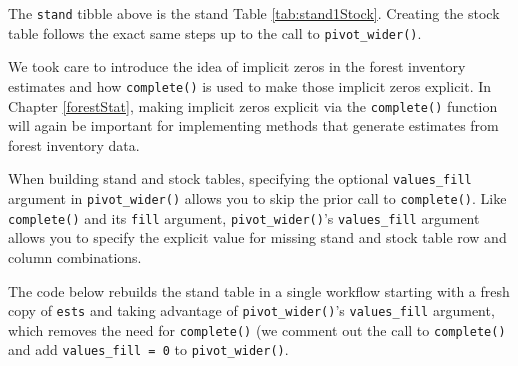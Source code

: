 \documentclass[
  11pt,
]{krantz}
\theoremstyle{definition}
\theoremstyle{definition}
\theoremstyle{definition}
\theoremstyle{definition}
\theoremstyle{remark}
\begin{document}
The \texttt{stand} tibble above is the stand Table \ref{tab:stand1Stock}. Creating the stock table follows the exact same steps up to the call to \texttt{pivot\_wider()}.

We took care to introduce the idea of implicit zeros in the forest inventory estimates and how \texttt{complete()} is used to make those implicit zeros explicit. In Chapter \ref{forestStat}, making implicit zeros explicit via the \texttt{complete()} function will again be important for implementing methods that generate estimates from forest inventory data.

When building stand and stock tables, specifying the optional \texttt{values\_fill} argument in \texttt{pivot\_wider()} allows you to skip the prior call to \texttt{complete()}. Like \texttt{complete()} and its \texttt{fill} argument, \texttt{pivot\_wider()}'s \texttt{values\_fill} argument allows you to specify the explicit value for missing stand and stock table row and column combinations.

The code below rebuilds the stand table in a single workflow starting with a fresh copy of \texttt{ests} and taking advantage of \texttt{pivot\_wider()}'s \texttt{values\_fill} argument, which removes the need for \texttt{complete()} (we comment out the call to \texttt{complete()} and add \texttt{values\_fill\ =\ 0} to \texttt{pivot\_wider()}.
\end{document}
